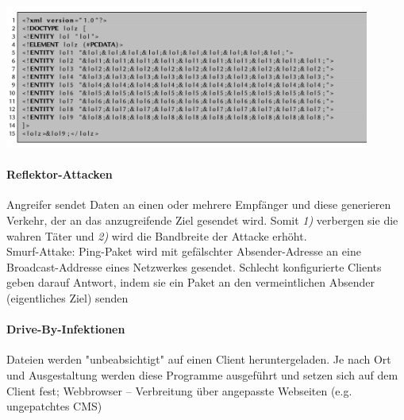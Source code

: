\documentclass[a4paper,12pt]{article}
\begin{document}
\begin{center}
\includegraphics[width=12cm]{img/13_bi_lau.png}
\end{center}



\paragraph{Reflektor-Attacken}
Angreifer sendet Daten an einen oder mehrere Empfänger und diese generieren Verkehr, der an das anzugreifende Ziel gesendet wird. Somit \emph{1)} verbergen sie die wahren Täter und \emph{2)} wird die Bandbreite der Attacke erhöht.\\

Smurf-Attake: Ping-Paket wird mit gefälschter Absender-Adresse an eine Broadcast-Addresse eines Netzwerkes gesendet. Schlecht konfigurierte Clients geben darauf Antwort, indem sie ein Paket an den vermeintlichen Absender (eigentliches Ziel) senden


\paragraph{Drive-By-Infektionen}
Dateien werden "unbeabsichtigt" auf einen Client heruntergeladen. Je nach Ort und Ausgestaltung werden diese Programme ausgeführt und setzen sich auf dem Client fest; Webbrowser -- Verbreitung über angepasste Webseiten (e.g. ungepatchtes CMS)


\end{document}
